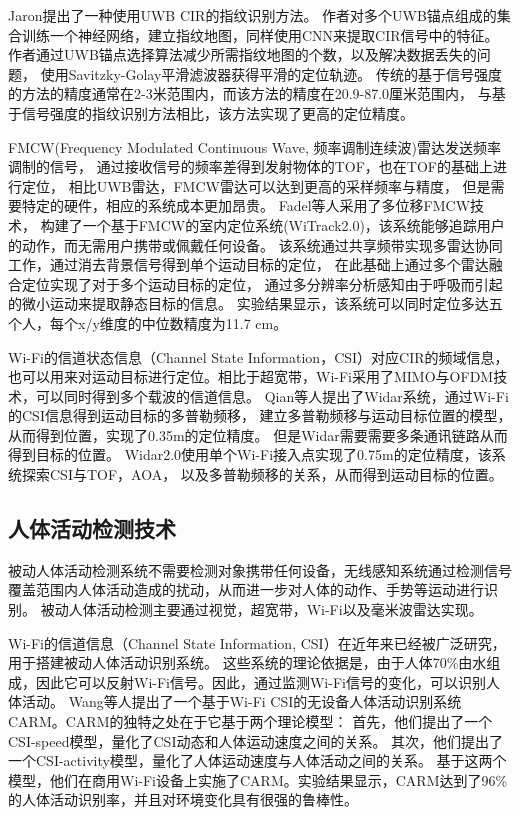 Jaron\cite{UWB_Fingerprinting}提出了一种使用UWB CIR的指纹识别方法。
作者对多个UWB锚点组成的集合训练一个神经网络，建立指纹地图，同样使用CNN来提取CIR信号中的特征。
作者通过UWB锚点选择算法减少所需指纹地图的个数，以及解决数据丢失的问题，
使用Savitzky-Golay平滑滤波器获得平滑的定位轨迹。
传统的基于信号强度的方法的精度通常在2-3米范围内，而该方法的精度在20.9-87.0厘米范围内，
与基于信号强度的指纹识别方法相比，该方法实现了更高的定位精度。

FMCW(Frequency Modulated Continuous Wave, 频率调制连续波)雷达发送频率调制的信号，
通过接收信号的频率差得到发射物体的TOF，也在TOF的基础上进行定位，
相比UWB雷达，FMCW雷达可以达到更高的采样频率与精度，
但是需要特定的硬件，相应的系统成本更加昂贵。
Fadel等人\cite{Adib_tracking,Adib2015MultiPersonLV}采用了多位移FMCW技术，
构建了一个基于FMCW的室内定位系统(WiTrack2.0)，该系统能够追踪用户的动作，而无需用户携带或佩戴任何设备。
该系统通过共享频带实现多雷达协同工作，通过消去背景信号得到单个运动目标的定位，
在此基础上通过多个雷达融合定位实现了对于多个运动目标的定位，
通过多分辨率分析感知由于呼吸而引起的微小运动来提取静态目标的信息。
实验结果显示，该系统可以同时定位多达五个人，每个x/y维度的中位数精度为11.7 cm。

Wi-Fi的信道状态信息（Channel State Information，CSI）对应CIR的频域信息，
也可以用来对运动目标进行定位。相比于超宽带，Wi-Fi采用了MIMO与OFDM技术，可以同时得到多个载波的信道信息。
Qian等人\cite{Qian}提出了Widar系统，通过Wi-Fi的CSI信息得到运动目标的多普勒频移，
建立多普勒频移与运动目标位置的模型，从而得到位置，实现了0.35m的定位精度。
但是Widar需要需要多条通讯链路从而得到目标的位置。
Widar2.0使用单个Wi-Fi接入点实现了0.75m的定位精度，该系统探索CSI与TOF，AOA，
以及多普勒频移的关系，从而得到运动目标的位置。

\subsection{人体活动检测技术}
被动人体活动检测系统不需要检测对象携带任何设备，无线感知系统通过检测信号覆盖范围内人体活动造成的扰动，从而进一步对人体的动作、手势等运动进行识别。
被动人体活动检测主要通过视觉，超宽带，Wi-Fi以及毫米波雷达实现。

Wi-Fi的信道信息（Channel State Information, CSI）在近年来已经被广泛研究，用于搭建被动人体活动识别系统。
这些系统的理论依据是，由于人体70\%由水组成，因此它可以反射Wi-Fi信号。因此，通过监测Wi-Fi信号的变化，可以识别人体活动。
Wang等人\cite{WiFi_Wang_HAR}提出了一个基于Wi-Fi CSI的无设备人体活动识别系统CARM。CARM的独特之处在于它基于两个理论模型：
首先，他们提出了一个CSI-speed模型，量化了CSI动态和人体运动速度之间的关系。
其次，他们提出了一个CSI-activity模型，量化了人体运动速度与人体活动之间的关系。
基于这两个模型，他们在商用Wi-Fi设备上实施了CARM。实验结果显示，CARM达到了96\%的人体活动识别率，并且对环境变化具有很强的鲁棒性。

